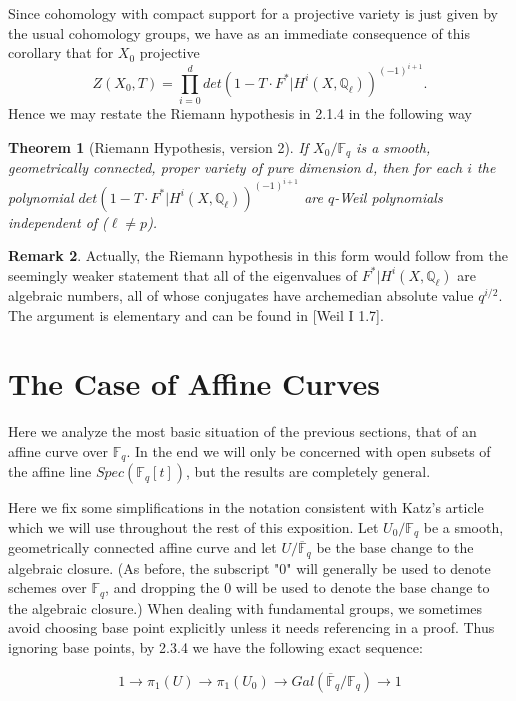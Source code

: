 \documentclass{ucbthesis}
\newtheorem{thm}{Theorem}[section]
\theoremstyle{definition}
\newtheorem{rmk}[thm]{Remark}
\theoremstyle{theorem}
\begin{document}
Since cohomology with compact support for a projective variety is just given by the usual cohomology groups, we have as an immediate consequence of this corollary that for $X_{0}$ projective $$Z(X_{0},T)=\prod\limits_{i=0}^{d}det(1-T\cdot F^{*}|H^{i}(X,\mathbb{Q}_{\ell}))^{(-1)^{i+1}}.$$ Hence we may restate the Riemann hypothesis in 2.1.4 in the following way

\begin{thm}[Riemann Hypothesis, version 2]
If $X_{0}/\mathbb{F}_{q}$ is a smooth, geometrically connected, proper variety of pure dimension $d$, then for each $i$ the polynomial 
$det(1-T\cdot F^{*}|H^{i}(X,\mathbb{Q}_{\ell}))^{(-1)^{i+1}}$ are $q$-Weil polynomials independent of ($\ell \neq p$).
\end{thm}

\begin{rmk}
Actually, the Riemann hypothesis in this form would follow from the seemingly weaker statement that all of the eigenvalues of $F^{*}|H^{i}(X,\mathbb{Q}_{\ell})$ are algebraic numbers, all of whose conjugates have archemedian absolute value $q^{i/2}$. The argument is elementary and can be found in [Weil I 1.7]. 
\end{rmk}

\section{The Case of Affine Curves}

Here we analyze the most basic situation of the previous sections, that of an affine curve over $\mathbb{F}_{q}$. In the end we will only be concerned with open subsets of the affine line $Spec(\mathbb{F}_{q}[t])$, but the results are completely general.

Here we fix some simplifications in the notation consistent with Katz's article which we will use throughout the rest of this exposition. Let $U_{0}/\mathbb{F}_{q}$ be a smooth, geometrically connected affine curve and let $U/\overline{\mathbb{F}}_{q}$ be the base change to the algebraic closure. (As before, the subscript "$0$" will generally be used to denote schemes over $\mathbb{F}_{q}$, and dropping the $0$ will be used to denote the base change to the algebraic closure.) When dealing with fundamental groups, we sometimes avoid choosing base point explicitly unless it needs referencing in a proof. Thus ignoring base points, by 2.3.4 we have the following exact sequence:

$$1 \rightarrow \pi_{1}(U) \rightarrow \pi_{1}(U_{0}) \rightarrow Gal(\overline{\mathbb{F}}_{q}/\mathbb{F}_{q}) \rightarrow 1 $$
\end{document}
